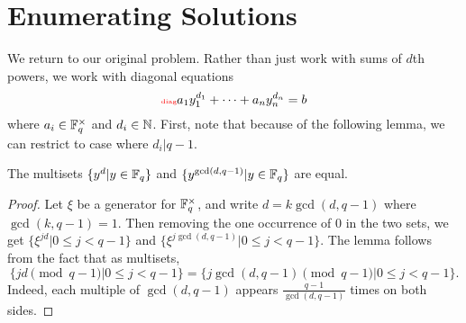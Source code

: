 \section{Enumerating Solutions}
We return to our original problem. 
Rather than just work with sums of $d$th powers, we work with diagonal equations
\begin{equation}\llabel{diag}
a_1y_1^{d_1}+\cdots +a_ny_n^{d_n}=b
\end{equation}
where $a_i\in \mathbb{F}_q^{\times}$ and $d_i\in \mathbb{N}$. First, note that because of the following lemma, we can restrict to case where $d_i|q-1$.
\begin{lem}
The multisets $\{y^d|y\in \mathbb{F}_q\}$ and $\{y^{\gcd(d,q-1)}|y\in \mathbb{F}_q\}$ are equal.
\end{lem}
\begin{proof}
Let $\xi$ be a generator for $\mathbb{F}_q^{\times}$, and write $d=k\gcd(d,q-1)$ where $\gcd(k,q-1)=1$. 
Then removing the one occurrence of 0 in the two sets, we get $\{\xi^{jd}|0\leq j<q-1\}$ and $\{\xi^{j\gcd(d,q-1)}|0\leq j<q-1\}$. 
The lemma follows from the fact that as multisets, \[\{jd\pmod{q-1}|0\leq j<q-1\}=\{j\gcd(d,q-1)\pmod{q-1}|0\leq j<q-1\}.\]
Indeed, each multiple of $\gcd(d,q-1)$ appears $\frac{q-1}{\gcd(d,q-1)}$ times on both sides.
\end{proof}

